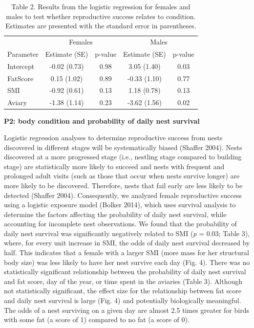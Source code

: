 \documentclass[
]{article}
\begin{document}
\begin{table}

\caption{\label{tab:p2 main results}Table 2. Results from the logistic regression for females and males to test whether reproductive success relates to condition. Estimates are presented with the standard error in parentheses.}
\centering
\begin{tabular}[t]{l|c|c|c|c}
\hline
\multicolumn{1}{c|}{ } & \multicolumn{2}{c|}{Females} & \multicolumn{2}{c}{Males} \\
\cline{2-3} \cline{4-5}
Parameter & Estimate (SE) & p-value & Estimate (SE) & p-value\\
\hline
Intercept & -0.02 (0.73) & 0.98 & 3.05 (1.40) & 0.03\\
\hline
FatScore & 0.15 (1.02) & 0.89 & -0.33 (1.10) & 0.77\\
\hline
SMI & -0.92 (0.61) & 0.13 & 1.18 (0.78) & 0.13\\
\hline
Aviary & -1.38 (1.14) & 0.23 & -3.62 (1.56) & 0.02\\
\hline
\end{tabular}
\end{table}

\pagebreak

\textbf{P2: body condition and probability of daily nest survival}

Logistic regression analyses to determine reproductive success from
nests discovered in different stages will be systematically biased
(Shaffer 2004). Nests discovered at a more progressed stage (i.e.,
nestling stage compared to building stage) are statistically more likely
to succeed and nests with frequent and prolonged adult visits (such as
those that occur when nests survive longer) are more likely to be
discovered. Therefore, nests that fail early are less likely to be
detected (Shaffer 2004). Consequently, we analyzed female reproductive
success using a logistic exposure model (Bolker 2014), which uses
survival analysis to determine the factors affecting the probability of
daily nest survival, while accounting for incomplete nest observations.
We found that the probability of daily nest survival was significantly
negatively related to SMI (\emph{p} = 0.03; Table 3), where, for every
unit increase in SMI, the odds of daily nest survival decreased by half.
This indicates that a female with a larger SMI (more mass for her
structural body size) was less likely to have her nest survive each day
(Fig. 4). There was no statistically significant relationship between
the probability of daily nest survival and fat score, day of the year,
or time spent in the aviaries (Table 3). Although not statistically
significant, the effect size for the relationship between fat score and
daily nest survival is large (Fig. 4) and potentially biologically
meaningful. The odds of a nest surviving on a given day are almost 2.5
times greater for birds with some fat (a score of 1) compared to no fat
(a score of 0).
\end{document}
